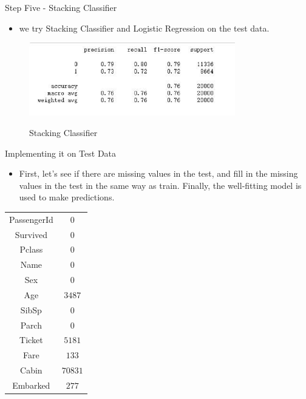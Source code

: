 \documentclass[
size=14pt,
paper=smartboard,  %
mode=present, 		%
display=slides, 	%
style=tuliplab,  	%
pauseslide,
fleqn,leqno]{powerdot}
\begin{document}
	
	\begin{slide}[toc=,bm=]{Step Five - Stacking Classifier}
		
		\begin{itemize}
			\item
			\smallskip
			we try Stacking Classifier and Logistic Regression on the test data.
		\end{itemize}
		\begin{figure}
			\centering
			\includegraphics[width=0.8\textwidth]{figures//fig11.eps}\\
			\caption{Stacking Classifier}
		\end{figure}
	\end{slide}
	
	
	\begin{slide}{Implementing it on Test Data}	
		\begin{itemize}
			\item
			\smallskip
			First, let's see if there are missing values in the test, and fill in the missing values in the test in the same way as train. Finally, the well-fitting model is used to make predictions.
		\end{itemize}
		\vspace{-0.6cm}
		\begin{center}	\begin{tabular}{c|c}
				\toprule
				\midrule
				{PassengerId}
				&  {$0$} \\
				{Survived}
				&  {$0$} \\
				{Pclass}
				&  {$0$} \\
				{Name}
				&  {$0$} \\
				{Sex}
				&  {$0$} \\
				{Age}
				&  {$3487$} \\
				{SibSp}
				&  {$0$} \\
				{Parch}
				&  {$0$} \\
				{Ticket}
				&  {$5181$} \\
				{Fare}
				&  {$133$} \\
				{Cabin}
				&  {$70831$} \\
				{Embarked}
				&  {$277$} \\
				\bottomrule
			\end{tabular}
		\end{center}
	\end{slide}
	
\end{document}
